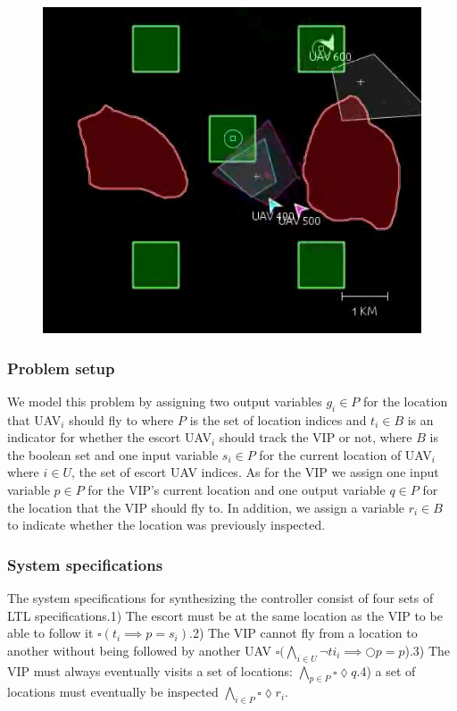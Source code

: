 \documentclass[]{article}
\begin{document}
\begin{figure}[htp]
    \centering
\includegraphics[scale=.4]{figs/vip.png}
    \caption{}
    \label{fig:vip}
\end{figure}


\subsubsection{Problem setup}\label{problem-setup}

We model this problem by assigning two output variables $g_{i} \in P$ for the location that UAV$_{i}$ should fly to where $P$ is the set of location indices and $t_{i}\in B$ is an indicator for whether the escort UAV$_{i}$ should track the VIP or not, where $B$ is the boolean set and one input variable $s_{i} \in P$ for the current location of UAV$_{i}$ where $i \in U$, the set of escort UAV indices. As for the VIP we assign one input variable $p \in P$ for the VIP's current location and one output variable $q \in P$ for the location that the VIP should fly to. In addition, we assign a variable $r_{i} \in B$ to indicate whether the location was previously inspected.

\subsubsection{System specifications}\label{system-specifications}
The system specifications for synthesizing the controller consist of four sets of LTL specifications.1) The escort must be at the same location as the VIP to be able to follow it $\square (t_{i} \implies p = s_{i})$.2) The VIP cannot fly from a location to another without being followed by another UAV $\square(\bigwedge\limits_{i\in U}\lnot ti_{i} \implies \Circle p = p$).3) The VIP must always eventually visits a set of locations: $\bigwedge\limits_{p\in P}\square \lozenge q$.4) a set of locations must eventually be inspected $\bigwedge\limits_{i\in P}\square \lozenge r_{i}$.
\end{document}
